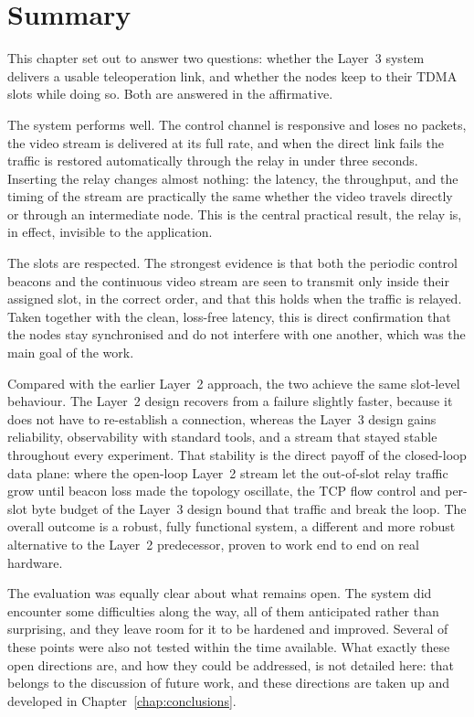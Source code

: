 \section{Summary}
\label{sec:eval-summary}

This chapter set out to answer two questions: whether the Layer~3 system
delivers a usable teleoperation link, and whether the nodes keep to their TDMA
slots while doing so. Both are answered in the affirmative.

The system performs well. The control channel is responsive and loses no
packets, the video stream is delivered at its full rate, and when the direct
link fails the traffic is restored automatically through the relay in under
three seconds. Inserting the relay changes almost nothing: the
latency, the throughput, and the timing of the stream are practically the same
whether the video travels directly or through an intermediate node. This is the
central practical result, the relay is, in effect, invisible to the
application.

The slots are respected. The strongest evidence is that both the periodic
control beacons and the continuous video stream are seen to transmit only inside
their assigned slot, in the correct order, and that this holds when the traffic
is relayed. Taken together with the clean, loss-free latency, this is direct
confirmation that the nodes stay synchronised and do not interfere with one
another, which was the main goal of the work.

Compared with the earlier Layer~2 approach, the two achieve the same
slot-level behaviour. The Layer~2 design recovers from a failure slightly
faster, because it does not have to re-establish a connection, whereas the
Layer~3 design gains reliability, observability with standard tools, and a
stream that stayed stable throughout every experiment. That stability is the
direct payoff of the closed-loop data plane: where the open-loop Layer~2 stream
let the out-of-slot relay traffic grow until beacon loss made the topology
oscillate, the TCP flow control and per-slot byte budget of the Layer~3 design
bound that traffic and break the loop. The overall outcome is a
robust, fully functional system, a different and more robust alternative to the
Layer~2 predecessor, proven to work end to end on real hardware.

The evaluation was equally clear about what remains open. The system did
encounter some difficulties along the way, all of them anticipated rather than
surprising, and they leave room for it to be hardened and improved. Several of
these points were also not tested within the time available. What exactly these
open directions are, and how they could be addressed, is not detailed here:
that belongs to the discussion of future work, and these directions are taken up
and developed in Chapter~\ref{chap:conclusions}.
